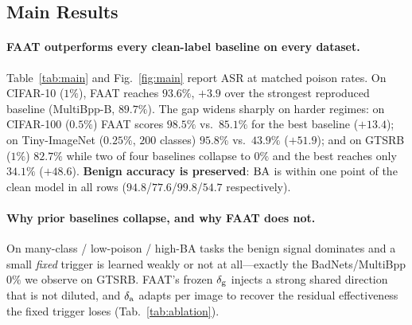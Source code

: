 \subsection{Main Results}
\label{sec:main}



\paragraph{FAAT outperforms every clean-label baseline on every dataset.}
Table~\ref{tab:main} and Fig.~\ref{fig:main} report ASR at matched poison rates.
On CIFAR-10 ($1\%$), FAAT reaches $93.6\%$, $+3.9$ over the strongest reproduced
baseline (MultiBpp-B, $89.7\%$). The gap widens sharply on harder regimes: on
CIFAR-100 ($0.5\%$) FAAT scores $98.5\%$ vs.\ $85.1\%$ for the best baseline
($+13.4$); on Tiny-ImageNet ($0.25\%$, $200$ classes) $95.8\%$ vs.\ $43.9\%$
($+51.9$); and on GTSRB ($1\%$) $82.7\%$ while two of four baselines collapse to
$0\%$ and the best reaches only $34.1\%$ ($+48.6$). \textbf{Benign accuracy is
preserved}: $\mathrm{BA}$ is within one point of the clean model in all rows
($94.8$/$77.6$/$99.8$/$54.7$ respectively).

\paragraph{Why prior baselines collapse, and why FAAT does not.}
On many-class / low-poison / high-BA tasks the benign signal dominates and a
small \emph{fixed} trigger is learned weakly or not at all---exactly the
BadNets/MultiBpp $0\%$ we observe on GTSRB. FAAT's frozen $\delta_{\mathrm{g}}$ injects a
strong shared direction that is not diluted, and $\delta_{\mathrm{a}}$ adapts per image to
recover the residual effectiveness the fixed trigger loses (Tab.~\ref{tab:ablation}).


